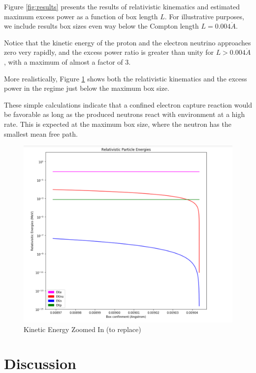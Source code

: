 \documentclass[%
 aip,
 jmp,%
 amsmath,amssymb,
 reprint,%
]{revtex4-1}
\begin{document}
Figure \ref{fig:results} presents the results of relativistic kinematics and estimated maximum  excess power  as a function of box length $L$.
For illustrative purposes, we include results box sizes even way below the Compton length $L=0.004\mathring{A}$. 

Notice that the kinetic energy of the proton and the electron neutrino approaches zero very rapidly, and the excess power ratio is greater than unity for $L>0.004\mathring{A}$, with a maximum of almost a factor of 3.

More realistically, Figure \ref{fig:results2}  shows both the relativistic kinematics and the excess power in the regime just below the maximum box size.

These simple calculations indicate that a confined electron capture reaction would be favorable as long as the produced neutrons react with environment at a high rate.  This is expected at the maximum box size, where the neutron has the smallest mean free path. 


\begin{figure}
 \begin{minipage}{\linewidth}
   \includegraphics[scale=0.5]{img/rel-energies.png}
   \caption{Kinetic Energy Zoomed In (to replace)}
  \label{fig:results2}
\end{minipage}
\end{figure}



\section{Discussion}
\end{document}
